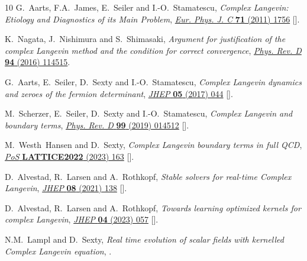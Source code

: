 \begin{thebibliography}{10}
G.~Aarts, F.A.~James, E.~Seiler and I.-O.~Stamatescu, \emph{{Complex Langevin:
  Etiology and Diagnostics of its Main Problem}},
  \href{https://doi.org/10.1140/epjc/s10052-011-1756-5}{\emph{Eur. Phys. J. C}
  {\bfseries 71} (2011) 1756}
  [\href{https://arxiv.org/abs/1101.3270}{{}}].

K.~Nagata, J.~Nishimura and S.~Shimasaki, \emph{Argument for justification of
  the complex {{Langevin}} method and the condition for correct convergence},
  \href{https://doi.org/10.1103/PhysRevD.94.114515}{\emph{Phys. Rev. D}
  {\bfseries 94} (2016) 114515}.

G.~Aarts, E.~Seiler, D.~Sexty and I.-O.~Stamatescu, \emph{{Complex Langevin
  dynamics and zeroes of the fermion determinant}},
  \href{https://doi.org/10.1007/JHEP05(2017)044}{\emph{JHEP} {\bfseries 05}
  (2017) 044} [\href{https://arxiv.org/abs/1701.02322}{{}}].

M.~Scherzer, E.~Seiler, D.~Sexty and I.-O.~Stamatescu, \emph{{Complex Langevin
  and boundary terms}},
  \href{https://doi.org/10.1103/PhysRevD.99.014512}{\emph{Phys. Rev. D}
  {\bfseries 99} (2019) 014512}
  [\href{https://arxiv.org/abs/1808.05187}{{}}].

M.~Westh~Hansen and D.~Sexty, \emph{{Complex Langevin boundary terms in full
  QCD}}, \href{https://doi.org/10.22323/1.430.0163}{\emph{PoS} {\bfseries
  LATTICE2022} (2023) 163} [\href{https://arxiv.org/abs/2212.12029}{{}}].

D.~Alvestad, R.~Larsen and A.~Rothkopf, \emph{{Stable solvers for real-time
  Complex Langevin}},
  \href{https://doi.org/10.1007/JHEP08(2021)138}{\emph{JHEP} {\bfseries 08}
  (2021) 138} [\href{https://arxiv.org/abs/2105.02735}{{}}].

D.~Alvestad, R.~Larsen and A.~Rothkopf, \emph{{Towards learning optimized
  kernels for complex Langevin}},
  \href{https://doi.org/10.1007/JHEP04(2023)057}{\emph{JHEP} {\bfseries 04}
  (2023) 057} [\href{https://arxiv.org/abs/2211.15625}{{}}].

N.M.~Lampl and D.~Sexty, \emph{{Real time evolution of scalar fields with
  kernelled Complex Langevin equation}},
  \href{https://arxiv.org/abs/2309.06103}{{}}.


\end{thebibliography}
